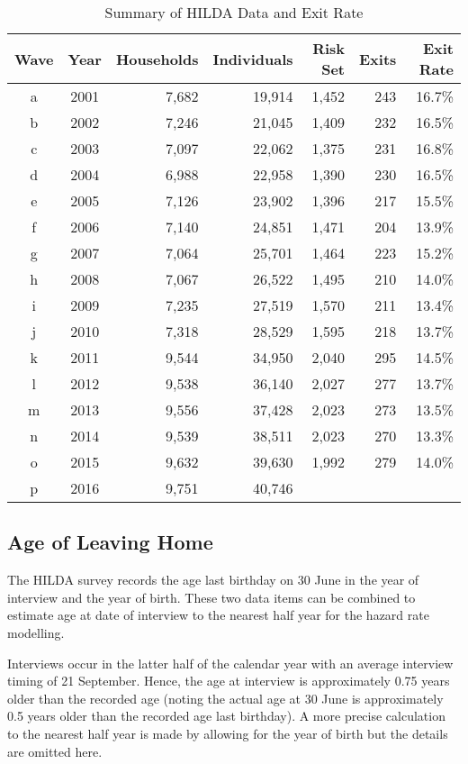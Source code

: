 \documentclass[12pt]{article}
\begin{document}
\begin{table}[htpb]
\centering
\caption{Summary of HILDA Data and Exit Rate}
\label{HILDAsum}
\begin{tabular}{ccrrrrr}
\toprule
Wave & Year & Households & Individuals & Risk Set & Exits & Exit Rate \\
\midrule
a & 2001 & 7,682 & 19,914 & 1,452 & 243 & 16.7\% \\
  b & 2002 & 7,246 & 21,045 & 1,409 & 232 & 16.5\% \\
  c & 2003 & 7,097 & 22,062 & 1,375 & 231 & 16.8\% \\
  d & 2004 & 6,988 & 22,958 & 1,390 & 230 & 16.5\% \\
  e & 2005 & 7,126 & 23,902 & 1,396 & 217 & 15.5\% \\
  f & 2006 & 7,140 & 24,851 & 1,471 & 204 & 13.9\% \\
  g & 2007 & 7,064 & 25,701 & 1,464 & 223 & 15.2\% \\
  h & 2008 & 7,067 & 26,522 & 1,495 & 210 & 14.0\% \\
  i & 2009 & 7,235 & 27,519 & 1,570 & 211 & 13.4\% \\
  j & 2010 & 7,318 & 28,529 & 1,595 & 218 & 13.7\% \\
  k & 2011 & 9,544 & 34,950 & 2,040 & 295 & 14.5\% \\
  l & 2012 & 9,538 & 36,140 & 2,027 & 277 & 13.7\% \\
  m & 2013 & 9,556 & 37,428 & 2,023 & 273 & 13.5\% \\
  n & 2014 & 9,539 & 38,511 & 2,023 & 270 & 13.3\% \\
  o & 2015 & 9,632 & 39,630 & 1,992 & 279 & 14.0\% \\
  p & 2016 & 9,751 & 40,746 &  &  &  \\
\bottomrule
\end{tabular}

\end{table}

\subsection{Age of Leaving Home}

The HILDA survey records the age last birthday on 30 June in the year of interview and the year of birth. These two data items can be combined to estimate age at date of interview to the nearest half year for the hazard rate modelling.

Interviews occur in the latter half of the calendar year with an average interview timing of 21 September. Hence, the age at interview is approximately 0.75 years older than the recorded age (noting the actual age at 30 June is approximately 0.5 years older than the recorded age last birthday). A more precise calculation to the nearest half year is made by allowing for the year of birth but the details are omitted here.
\end{document}
